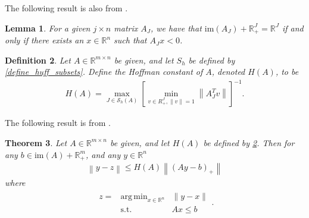 \documentclass{article}
\newtheorem{theorem}{Theorem}[section]
\newtheorem{definition}[theorem]{Definition}
\newtheorem{lemma}[theorem]{Lemma}
\theoremstyle{case}
\numberwithin{theorem}{subsection}
\DeclareMathOperator*{\argmin}{arg\,min}
\newcommand{\reals}{\mathbb R}
\newcommand{\Rn}{\mathbb R^n}
\newcommand{\image}{{\textrm{im}}}
\begin{document}
The following result is also from \cite{pena2020new}.
\begin{lemma}
For a given $j \times n$ matrix $A_J$, we have that 
$\image(A_J) + \reals_+^J = \reals^J$
if and only if there exists an $x \in \Rn$ such that
$A_J x < 0$.
\end{lemma}

\begin{definition}
\label{hoffman_definition}
Let $A \in \mathbb R^{m \times n}$ be given, and let $S_h$ be defined by \cref{define_huff_subsets}.
Define the Hoffman constant of $A$, denoted $H(A)$, to be
\begin{align*}
H(A) = \max_{J \in \mathcal S_h(A)} \left[\min_{v \in R^J_+, \|v\| = 1}  \left\|A_J^Tv\right\| \right]^{-1}.
\end{align*}
\end{definition}


The following result is from \cite{pena2020new}.
\begin{theorem}
\label{hoffmans_theorem}
Let $A \in \mathbb R^{m \times n}$ be given, and let $H(A)$ be defined by \cref{hoffman_definition}.
Then for any
$b \in \image(A) + \reals^m_+$, and any $y \in \Rn$
\begin{align*}
\left\|y - z\right\| \le H(A) \left\|\left(Ay - b\right)_+\right\|
\end{align*}
where
\begin{align*}
\begin{array}{ccc}
z = & \argmin_{x \in \Rn} & \|y - x\| \\
      & \textrm{s.t.}    & Ax \le b
\end{array}.
\end{align*}
\end{theorem}
\end{document}
